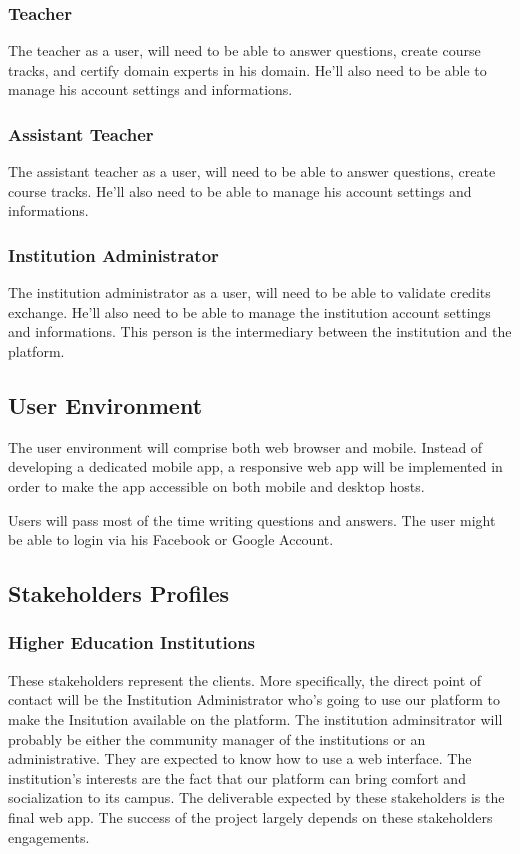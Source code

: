 \documentclass[12pt,a4paper,oneside, titlepage]{article}
\begin{document}
	    	\subsubsection{Teacher}
	    	The teacher as a user, will need to be able to answer questions, create course tracks, and certify domain experts 
	    	in his domain. He'll also need to be able to manage his account settings and informations.

	    \subsubsection{Assistant Teacher}
	     The assistant teacher as a user, will need to be able to answer questions, create course tracks. He'll also
	     need to be able to manage his account settings and informations.
	     
        \subsubsection{Institution Administrator}
        The institution administrator as a user, will need to be able to validate credits exchange. He'll also
	    need to be able to manage the institution account settings and informations. This person is the intermediary
	    between the institution and the platform.
	    
	    
	\subsection{User Environment}
	The user environment will comprise both web browser and mobile. Instead of developing a dedicated mobile app, a 
	responsive web app will be implemented in order to make the app accessible on both mobile and desktop hosts. \newline
	
	Users will pass most of the time writing questions and answers. The user might be able to login via his Facebook or 
	Google Account.
	
	\newpage 
	
	\subsection{Stakeholders Profiles}
	    \subsubsection{Higher Education Institutions}
	    These stakeholders represent the clients. More specifically, the direct point of contact will be the Institution
	    Administrator who's going to use our platform to make the Insitution available on the platform. The institution 
	    adminsitrator will probably be either the community manager of the institutions or an administrative. They are 
	    expected to know how to use a web interface. The institution's interests are the fact that our platform can bring
	    comfort and socialization to its campus. The deliverable expected by these stakeholders is the final web app. The
	    success of the project largely depends on these stakeholders engagements.
	    
\end{document}
